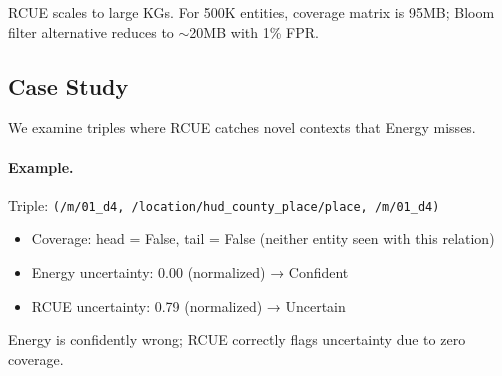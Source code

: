 RCUE scales to large KGs. For 500K entities, coverage matrix is 95MB; Bloom filter alternative reduces to $\sim$20MB with 1\% FPR.

\subsection{Case Study}

We examine triples where RCUE catches novel contexts that Energy misses.

\paragraph{Example.}
Triple: \texttt{(/m/01\_d4, /location/hud\_county\_place/place, /m/01\_d4)}
\begin{itemize}
    \item Coverage: head = False, tail = False (neither entity seen with this relation)
    \item Energy uncertainty: 0.00 (normalized) → Confident
    \item RCUE uncertainty: 0.79 (normalized) → Uncertain
\end{itemize}

Energy is confidently wrong; RCUE correctly flags uncertainty due to zero coverage.
